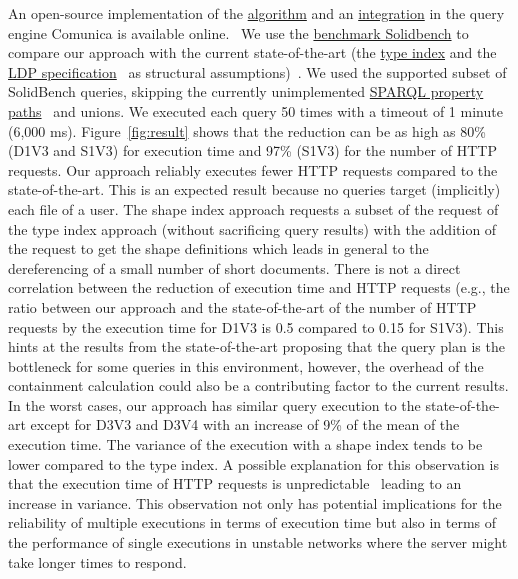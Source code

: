 An open-source implementation of the \href{https://github.com/constraintAutomaton/query-shape-detection}{algorithm} and an 
\href{https://github.com/constraintAutomaton/comunica-feature-link-traversal/tree/feature/shapeIndex}{integration} in the query engine 
Comunica \cite{taelman_iswc_resources_comunica_2018} is available online.~
We use the \href{https://github.com/SolidBench/SolidBench.js}{benchmark Solidbench} \cite{Taelman2023} to compare our approach with the current state-of-the-art (the \href{https://solid.github.io/type-indexes/}{type index} and the \href{https://www.w3.org/TR/ldp/}{LDP specification}~ as structural assumptions)~\cite{Taelman2023}.
We used the supported subset of SolidBench queries, skipping the currently unimplemented \href{https://www.w3.org/TR/sparql11-query/#propertypaths}{SPARQL property paths}~ and unions.
We executed each query 50 times with a timeout of 1 minute (6,000 ms).
Figure~\ref{fig:result} shows that the reduction can be as high as 80\% (D1V3 and S1V3) for execution time 
and 97\% (S1V3) for the number of HTTP requests.
Our approach reliably executes fewer HTTP requests compared to the state-of-the-art.
This is an expected result because no queries target (implicitly) each file of a user.
The shape index approach requests a subset of the request of the type index approach (without sacrificing query results) with the addition of the request to get the shape definitions which leads in general to the dereferencing of a small number of short documents.
There is not a direct correlation between the reduction of execution time and HTTP requests (e.g., the ratio 
between our approach and the state-of-the-art of the number of HTTP requests by the execution time for D1V3 is 0.5 compared to 0.15 for S1V3).
This hints at the results from the state-of-the-art \cite{Taelman2023} proposing that the query plan is the bottleneck for some queries in this environment,
however, the overhead of the containment calculation could also be a contributing factor to the current results.
In the worst cases, our approach  has similar query execution to the state-of-the-art except for D3V3 and D3V4 with an increase of 9\% of the mean of the execution time.
The variance of the execution with a shape index tends to be lower compared to the type index. 
A possible explanation for this observation is that the execution time of HTTP requests is unpredictable~\cite{hartig2016walking}
leading to an increase in variance.
This observation not only has potential implications for the reliability of multiple executions in terms of execution time
but also in terms of the performance of single executions in unstable networks where the server might take longer times to respond. 
